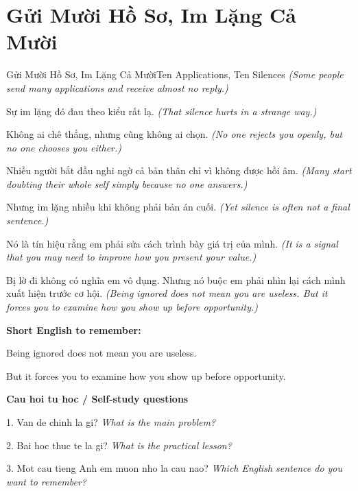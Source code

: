 \section{Gửi Mười Hồ Sơ, Im Lặng Cả Mười}
\begin{truyen}{Gửi Mười Hồ Sơ, Im Lặng Cả Mười}{Ten Applications, Ten Silences}
\textit{(Some people send many applications and receive almost no reply.)}

Sự im lặng đó đau theo kiểu rất lạ.
\textit{(That silence hurts in a strange way.)}

Không ai chê thẳng, nhưng cũng không ai chọn.
\textit{(No one rejects you openly, but no one chooses you either.)}

Nhiều người bắt đầu nghi ngờ cả bản thân chỉ vì không được hồi âm.
\textit{(Many start doubting their whole self simply because no one answers.)}

Nhưng im lặng nhiều khi không phải bản án cuối.
\textit{(Yet silence is often not a final sentence.)}

Nó là tín hiệu rằng em phải sửa cách trình bày giá trị của mình.
\textit{(It is a signal that you may need to improve how you present your value.)}

\end{truyen}

\begin{baihoc}
Bị lờ đi không có nghĩa em vô dụng. Nhưng nó buộc em phải nhìn lại cách mình xuất hiện trước cơ hội.
\textit{(Being ignored does not mean you are useless. But it forces you to examine how you show up before opportunity.)}
\end{baihoc}

\begin{ghinhoanh}
\textbf{Short English to remember:}

Being ignored does not mean you are useless.

But it forces you to examine how you show up before opportunity.

\end{ghinhoanh}

\begin{tuhocnhanh}
\textbf{Cau hoi tu hoc / Self-study questions}

1. Van de chinh la gi? \textit{What is the main problem?}

2. Bai hoc thuc te la gi? \textit{What is the practical lesson?}

3. Mot cau tieng Anh em muon nho la cau nao? \textit{Which English sentence do you want to remember?}
\end{tuhocnhanh}
\ngancach

